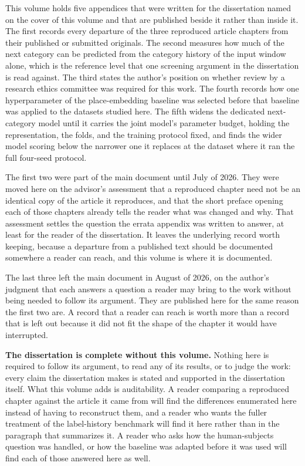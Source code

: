 \documentclass[
    12pt,
    openright,
    oneside,
    a4paper,
    sumario=tradicional,
    brazil,
    english,
]{abntex2}
\begin{document}
    This volume holds five appendices that were
    written for the dissertation named on the
    cover of this volume and that are published beside it rather than inside it. The first
    records every departure of the three reproduced article chapters from their published or
    submitted originals. The second measures how much of the next category can be predicted from
    the category history of the input window alone, which is the reference level that one screening
    argument in the dissertation is read against. The third states the author's position on
    whether review by a research ethics committee was required for this work. The fourth records how
    one hyperparameter of the place-embedding baseline was selected before that baseline was applied
    to the datasets studied here. The fifth widens the dedicated next-category model until it carries
    the joint model's parameter budget, holding the representation, the folds, and the training
    protocol fixed, and finds the wider model scoring below the narrower one it replaces at the
    dataset where it ran the full four-seed protocol.

    The first two were part of the main document until July of 2026. They were moved here on the
    advisor's assessment that a reproduced chapter need not be an identical copy of the article
    it reproduces, and that the short preface opening each of those chapters already tells the
    reader what was changed and why. That assessment settles the question the errata appendix
    was written to answer, at least for the reader of the dissertation. It leaves the underlying
    record worth keeping, because a departure from a published text should be documented
    somewhere a reader can reach, and this volume is where it is documented.

    The last three left the main document in August of 2026, on the author's judgment that each
    answers a question a reader may bring to the work without being needed to follow its argument.
    They are published here for the same reason the first two are. A record that a reader can reach
    is worth more than a record that is left out because it did not fit the shape of the chapter it
    would have interrupted.

    \textbf{The dissertation is complete without this volume.} Nothing here is required to
    follow its argument, to read any of its results, or to judge the work: every claim the
    dissertation makes is stated and supported in the dissertation itself. What this volume adds
    is auditability. A reader comparing a reproduced chapter against the article it came from
    will find the differences enumerated here instead of having to reconstruct them, and a
    reader who wants the fuller treatment of the label-history benchmark will find it here
    rather than in the paragraph that summarizes it. A reader who asks how the human-subjects
    question was handled, or how the baseline was adapted before it
    was used will find each of those answered here as well.
\end{document}
